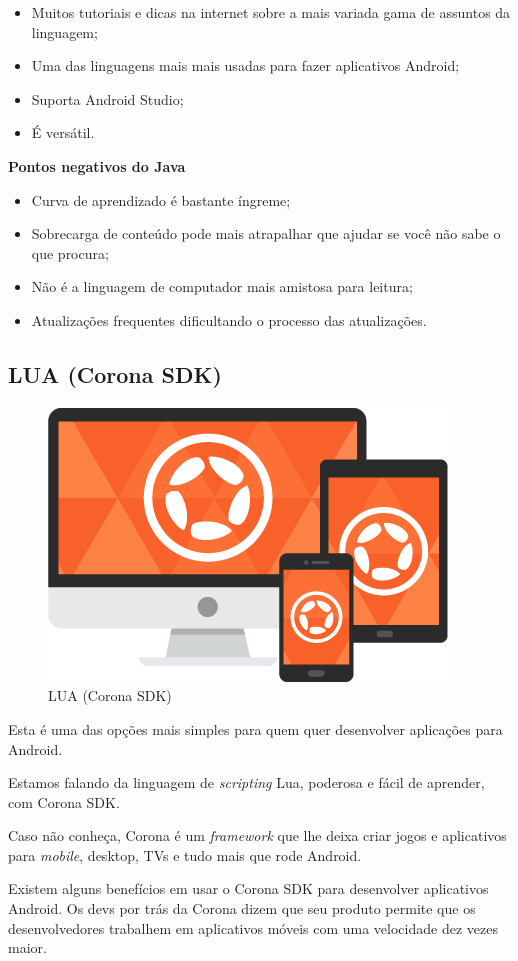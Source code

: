 \begin{itemize}
    \item Muitos tutoriais e dicas na internet sobre a mais variada gama de assuntos da linguagem;
    \item Uma das linguagens mais mais usadas para fazer aplicativos Android;
    \item Suporta Android Studio;
    \item É versátil.
\end{itemize}

\textbf{Pontos negativos do Java}

\begin{itemize}
    \item Curva de aprendizado é bastante íngreme;
    \item Sobrecarga de conteúdo pode mais atrapalhar que ajudar se você não sabe o que procura;
    \item Não é a linguagem de computador mais amistosa para leitura;
    \item Atualizações frequentes dificultando o processo das atualizações.
\end{itemize}

\subsection{LUA (Corona SDK)}

\begin{figure}[H]
    \centering
    \includegraphics[width=0.3\linewidth]{dados/figuras/corona}
    \caption{LUA (Corona SDK)}
    \label{fig:corona}
\end{figure}

Esta é uma das opções mais simples para quem quer desenvolver aplicações para Android.

Estamos falando da linguagem de \textit{scripting} Lua, poderosa e fácil de aprender, com Corona SDK.

Caso não conheça, Corona é um \textit{framework} que lhe deixa criar jogos e aplicativos para \textit{mobile}, desktop, TVs e tudo mais que rode Android.

Existem alguns benefícios em usar o Corona SDK para desenvolver aplicativos Android. Os devs por trás da Corona dizem que seu produto permite que os desenvolvedores trabalhem em aplicativos móveis com uma velocidade dez vezes maior.

